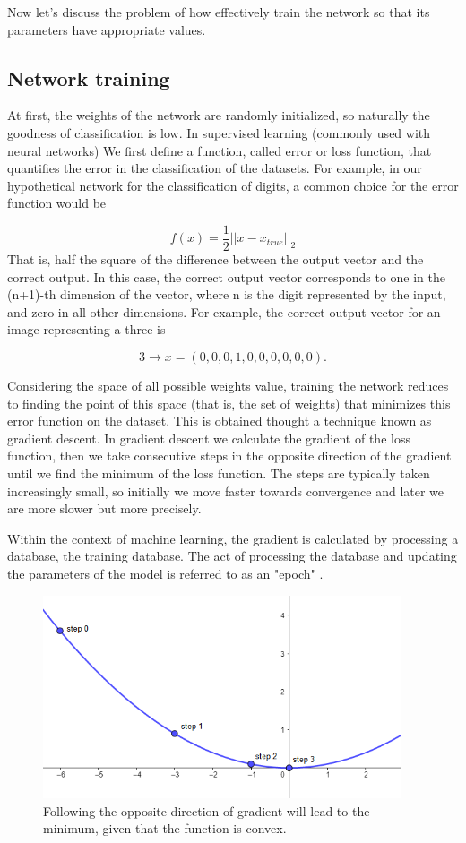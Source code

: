 \documentclass[a4paper]{report}
\begin{document}
Now let's discuss the problem of how effectively train the network so that its parameters have appropriate values.

\subsection{Network training}
At first, the weights of the network are randomly initialized, so naturally the goodness of classification is low.
In supervised learning (commonly used with neural networks) We first define a function, called error or loss function, that quantifies the error in the classification of the datasets.
For example, in our hypothetical network for the classification of digits, a common choice for the error function would be

\begin{equation}
f(x)=\frac{1}{2}||x-x_{true}||_2
\label{true}
\end{equation}
That is, half the square of the difference between the output vector and the correct output.
In this case, the correct output vector corresponds to one in the (n+1)-th dimension of the vector, where n is the digit represented by the input, and zero in all other dimensions. For example, the correct output vector for an image representing a three is

\begin{equation}
	3 \rightarrow x = (0,0,0,1,0,0,0,0,0,0).
\end{equation}

Considering the space of all possible weights value, training the network reduces to finding the point of this space (that is, the set of weights) that minimizes this error function on the dataset.
This is obtained thought a technique known as gradient descent.
In gradient descent we calculate the gradient of the loss function, then we take consecutive steps in the opposite direction of the gradient until we find the minimum of the loss function.
The steps are typically taken increasingly small, so initially we move faster towards convergence and later we are more slower but more precisely.

Within the context of machine learning, the gradient is calculated by processing a database, the training database. The act of processing the database and updating the parameters of the model is referred to as an "epoch" \cite{spall2005introduction}.

\begin{figure}[H]
\centering
\includegraphics[height=6cm]{o/gradient.png}
\caption{Following the opposite direction of gradient will lead to the minimum, given that the function is convex.}
\end{figure}
\end{document}
